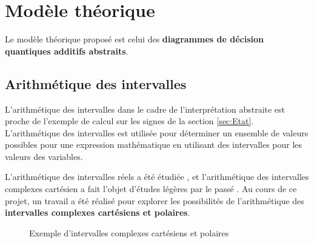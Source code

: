 \newpage

\chapter{Modèle théorique}
\label{ch:Modele}

Le modèle théorique proposé est celui des \textbf{diagrammes de décision quantiques additifs abstraits}.

\section{Arithmétique des intervalles}
\label{sec:ArithmetiqueIntervalles}

L'arithmétique des intervalles dans le cadre de l'interprétation abstraite est proche de l'exemple de calcul sur les signes de la section \ref{sec:Etat}. L'arithmétique des intervalles est utilisée pour déterminer un ensemble de valeurs possibles pour une expression mathématique en utilisant des intervalles pour les valeurs des variables.

L'arithmétique des intervalles réels a été étudiée \cite{Sunaga_2009}, et l'arithmétique des intervalles complexes cartésien a fait l'objet d'études légères par le passé \cite{Rokne_1971}. Au cours de ce projet, un travail a été réalisé pour explorer les possibilités de l'arithmétique des \textbf{intervalles complexes cartésiens et polaires}.

\begin{figure}
  \centering
  \caption{Exemple d'intervalles complexes cartésiens et polaires}
  \label{fig:intervalles}
\end{figure}

